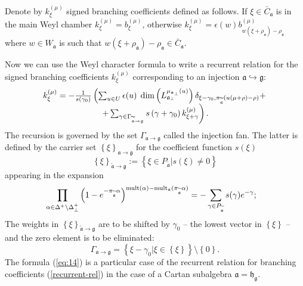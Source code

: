 \documentclass[preprint,12pt]{elsarticle}
\newcommand{\gf}{\mathfrak{g}}
\newcommand{\af}{\mathfrak{a}}
\newcommand{\afb}{\mathfrak{a}_{\bot}}
\newcommand{\hf}{\mathfrak{h}}
\newcommand{\hfg}{\hf_{\gf}}
\begin{document}
Denote by  $k_{\xi }^{\left( \mu \right) }$ signed branching coefficients defined as follows. If $\xi\in \bar C_{\af}$ is in the main Weyl chamber $k_{\xi}^{(\mu)}=b^{(\mu)}_{\xi}$, otherwise $k_{\xi}^{(\mu)}=\epsilon(w) b^{(\mu)}_{w (\xi+\rho_{\af})-\rho_{\af}}$ where $w\in W_{\af}$ is such that $w (\xi+\rho_{\af})-\rho_{\af}\in \bar C_{\af}$. 

Now we can use the Weyl character formula to write a
recurrent relation \cite{2010arXiv1007.0318L} for the signed branching
coefficients $k_{\xi }^{\left( \mu \right) }$ corresponding to an
injection $\af\hookrightarrow \gf$:
\begin{equation}
\begin{array}{c}
k_{\xi }^{\left( \mu \right) }=-\frac{1}{s\left( \gamma _{0}\right) }\left(
\sum_{u\in U}\epsilon (u)\;\dim \left( L_{\afb}^{\mu _{\af%
_{\perp }}\left( u\right) }\right) \delta _{\xi -\gamma _{0},\pi _{%
\widetilde{\af}}(u(\mu +\rho )-\rho )}+\right.  \\
\left. +\sum_{\gamma \in \Gamma _{\widetilde{\af}\rightarrow \gf%
}}s\left( \gamma +\gamma _{0}\right) k_{\xi +\gamma }^{\left( \mu \right)
}\right) .
\end{array}
\label{recurrent-rel}
\end{equation}
The recursion is governed by the set $\Gamma _{\af\rightarrow \gf}$ called the injection fan. The latter is defined by the
carrier set $\left\{ \xi \right\} _{\af\rightarrow \gf}$ for the
coefficient function $s(\xi )$
\begin{equation*}
\left\{ \xi \right\} _{\widetilde{\af}\rightarrow \gf}:=\left\{
\xi \in P_{\widetilde{\af}}|s(\xi )\neq 0\right\}
\end{equation*}
appearing in the expansion
\begin{equation}
\prod_{\alpha \in \Delta ^{+}\setminus \Delta _{\bot }^{+}}\left( 1-e^{-\pi
_{\widetilde{\af}}\alpha }\right) ^{\mathrm{mult}(\alpha )-\mathrm{mult}%
_{\af}(\pi _{\widetilde{\af}}\alpha )}=-\sum_{\gamma \in P_{%
\widetilde{\af}}}s(\gamma )e^{-\gamma };\quad
\end{equation}
The weights in $\left\{ \xi \right\} _{\widetilde{\af}\rightarrow \gf}$ are to be shifted by $\gamma _{0}$ -- the lowest vector in $\left\{ \xi
\right\} $ -- and the zero element is to be eliminated:
\begin{equation}
\Gamma _{\af\rightarrow \gf}=\left\{ \xi -\gamma
_{0}|\xi \in \left\{ \xi \right\} \right\} \setminus \left\{ 0\right\} .
\end{equation}
The formula (\ref{eq:14}) is a particular case of the recurrent relation for branching coefficients (\ref{recurrent-rel}) in the case of a Cartan subalgebra $\af=\hfg$.
\end{document}
